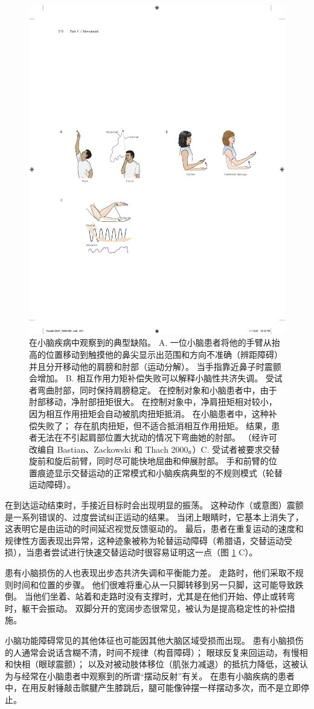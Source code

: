 \begin{figure}[htbp]
	\centering
	\includegraphics[width=0.5\linewidth]{chap37/fig_37_1}
	\caption{在小脑疾病中观察到的典型缺陷。
		A. 一位小脑患者将他的手臂从抬高的位置移动到触摸他的鼻尖显示出范围和方向不准确（辨距障碍）并且分开移动他的肩膀和肘部（运动分解）。 
		当手指靠近鼻子时震颤会增加。 
		B. 相互作用力矩补偿失败可以解释小脑性共济失调。 受试者弯曲肘部，同时保持肩膀稳定。 在控制对象和小脑患者中，由于肘部移动，净肘部扭矩很大。 在控制对象中，净肩扭矩相对较小，因为相互作用扭矩会自动被肌肉扭矩抵消。 在小脑患者中，这种补偿失败了； 存在肌肉扭矩，但不适合抵消相互作用扭矩。 结果，患者无法在不引起肩部位置大扰动的情况下弯曲她的肘部。 （经许可改编自 Bastian、Zackowski 和 Thach 2000。）C. 受试者被要求交替旋前和旋后前臂，同时尽可能快地屈曲和伸展肘部。 手和前臂的位置痕迹显示交替运动的正常模式和小脑疾病典型的不规则模式（轮替运动障碍）。}
	\label{fig:37_1}
\end{figure}


在到达运动结束时，手接近目标时会出现明显的振荡。
这种动作（或意图）震颤是一系列错误的、过度尝试纠正运动的结果。
当闭上眼睛时，它基本上消失了，这表明它是由运动的时间延迟视觉反馈驱动的。
最后，患者在重复运动的速度和规律性方面表现出异常，这种迹象被称为轮替运动障碍（希腊语，交替运动受损），当患者尝试进行快速交替运动时很容易证明这一点（图 \ref{fig:37_1} C）。


患有小脑损伤的人也表现出步态共济失调和平衡能力差。 走路时，他们采取不规则时间和位置的步骤。
他们很难将重心从一只脚转移到另一只脚，这可能导致跌倒。
当他们坐着、站着和走路时没有支撑时，尤其是在他们开始、停止或转弯时，躯干会振动。
双脚分开的宽阔步态很常见，被认为是提高稳定性的补偿措施。


小脑功能障碍常见的其他体征也可能因其他大脑区域受损而出现。
患有小脑损伤的人通常会说话含糊不清，时间不规律（构音障碍）；
眼球反复来回运动，有慢相和快相（眼球震颤）；
以及对被动肢体移位（肌张力减退）的抵抗力降低，这被认为与经常在小脑患者中观察到的所谓“摆动反射”有关。
在患有小脑疾病的患者中，在用反射锤敲击髌腱产生膝跳后，腿可能像钟摆一样摆动多次，而不是立即停止。


